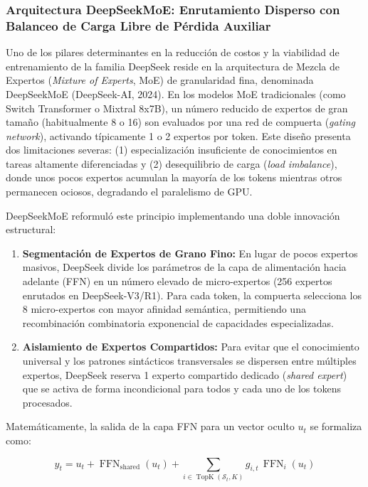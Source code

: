 \subsubsection{Arquitectura DeepSeekMoE: Enrutamiento Disperso con Balanceo de Carga Libre de Pérdida Auxiliar}

Uno de los pilares determinantes en la reducción de costos y la viabilidad de entrenamiento de la familia DeepSeek reside en la arquitectura de Mezcla de Expertos (\textit{Mixture of Experts}, MoE) de granularidad fina, denominada DeepSeekMoE (DeepSeek-AI, 2024). En los modelos MoE tradicionales (como Switch Transformer o Mixtral 8x7B), un número reducido de expertos de gran tamaño (habitualmente 8 o 16) son evaluados por una red de compuerta (\textit{gating network}), activando típicamente 1 o 2 expertos por token. Este diseño presenta dos limitaciones severas: (1) especialización insuficiente de conocimientos en tareas altamente diferenciadas y (2) desequilibrio de carga (\textit{load imbalance}), donde unos pocos expertos acumulan la mayoría de los tokens mientras otros permanecen ociosos, degradando el paralelismo de GPU.

DeepSeekMoE reformuló este principio implementando una doble innovación estructural:
\begin{enumerate}[label=\alph*), leftmargin=2em]
    \item \textbf{Segmentación de Expertos de Grano Fino:} En lugar de pocos expertos masivos, DeepSeek divide los parámetros de la capa de alimentación hacia adelante (FFN) en un número elevado de micro-expertos (256 expertos enrutados en DeepSeek-V3/R1). Para cada token, la compuerta selecciona los 8 micro-expertos con mayor afinidad semántica, permitiendo una recombinación combinatoria exponencial de capacidades especializadas.
    \item \textbf{Aislamiento de Expertos Compartidos:} Para evitar que el conocimiento universal y los patrones sintácticos transversales se dispersen entre múltiples expertos, DeepSeek reserva 1 experto compartido dedicado (\textit{shared expert}) que se activa de forma incondicional para todos y cada uno de los tokens procesados.
\end{enumerate}

Matemáticamente, la salida de la capa FFN para un vector oculto $u_t$ se formaliza como:

\begin{equation}
    y_t = u_t + \operatorname{FFN}_{\text{shared}}(u_t) + \sum_{i \in \operatorname{TopK}(\mathcal{S}_t, K)} g_{i, t} \, \operatorname{FFN}_i(u_t)
    \label{eq:deepseek_moe_output}
\end{equation}

